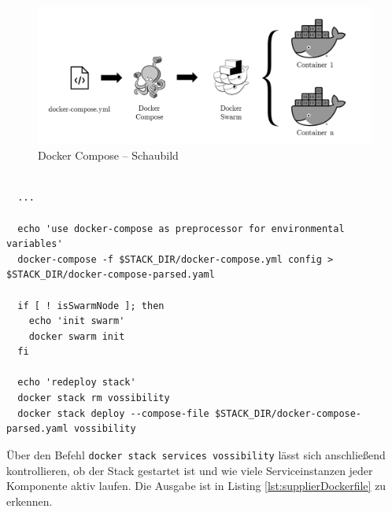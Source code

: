 \begin{figure}[ht!]
	\centering
	\includegraphics[width=.95\linewidth]{kapitel/problemloesung/implementierung/_img/stack-compose}
	\caption[Docker Compose -- Schaubild]{Docker Compose -- Schaubild}
	\label{fig:dockerComposeOverview}
\end{figure}

\begin{minipage}{\linewidth}
\begin{lstlisting}[style=bashStyle,caption={start-stack-services.sh},label=lst:summary-start-stack-services]

  ...

  echo 'use docker-compose as preprocessor for environmental variables'
  docker-compose -f $STACK_DIR/docker-compose.yml config > $STACK_DIR/docker-compose-parsed.yaml

  if [ ! isSwarmNode ]; then
    echo 'init swarm'
    docker swarm init
  fi

  echo 'redeploy stack'
  docker stack rm vossibility
  docker stack deploy --compose-file $STACK_DIR/docker-compose-parsed.yaml vossibility
\end{lstlisting}
\end{minipage}

Über den Befehl \verb+docker stack services vossibility+ lässt sich anschließend kontrollieren, ob der Stack gestartet ist und wie viele Serviceinstanzen jeder Komponente aktiv laufen. Die Ausgabe ist in Listing \ref{lst:supplierDockerfile} zu erkennen.

